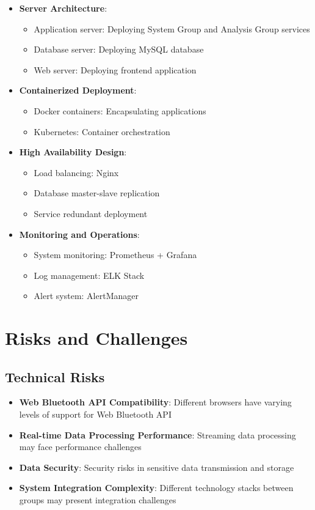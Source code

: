 \documentclass[a4paper,12pt]{article}
\begin{document}
\begin{itemize}
  \item \textbf{Server Architecture}:
    \begin{itemize}
      \item Application server: Deploying System Group and Analysis Group services
      \item Database server: Deploying MySQL database
      \item Web server: Deploying frontend application
    \end{itemize}
  
  \item \textbf{Containerized Deployment}:
    \begin{itemize}
      \item Docker containers: Encapsulating applications
      \item Kubernetes: Container orchestration
    \end{itemize}
  
  \item \textbf{High Availability Design}:
    \begin{itemize}
      \item Load balancing: Nginx
      \item Database master-slave replication
      \item Service redundant deployment
    \end{itemize}
  
  \item \textbf{Monitoring and Operations}:
    \begin{itemize}
      \item System monitoring: Prometheus + Grafana
      \item Log management: ELK Stack
      \item Alert system: AlertManager
    \end{itemize}
\end{itemize}

\section{Risks and Challenges}

\subsection{Technical Risks}

\begin{itemize}
  \item \textbf{Web Bluetooth API Compatibility}: Different browsers have varying levels of support for Web Bluetooth API
  \item \textbf{Real-time Data Processing Performance}: Streaming data processing may face performance challenges
  \item \textbf{Data Security}: Security risks in sensitive data transmission and storage
  \item \textbf{System Integration Complexity}: Different technology stacks between groups may present integration challenges
\end{itemize}
\end{document}
